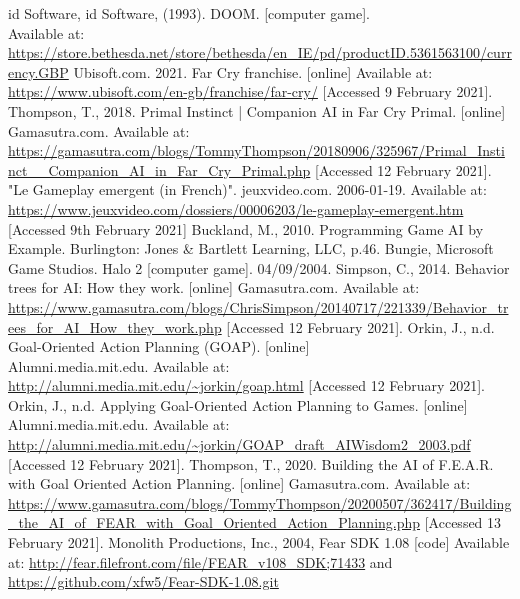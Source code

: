 \documentclass[11pt]{report}
\begin{document}
\begin{thebibliography}{}
    id Software, id Software, (1993). DOOM. [computer game]. \\Available at: \url{https://store.bethesda.net/store/bethesda/en_IE/pd/productID.5361563100/currency.GBP}
    Ubisoft.com. 2021. Far Cry franchise. [online] Available at: \url{https://www.ubisoft.com/en-gb/franchise/far-cry/} [Accessed 9 February 2021].
    Thompson, T., 2018. Primal Instinct | Companion AI in Far Cry Primal. [online] Gamasutra.com. Available at: \url{https://gamasutra.com/blogs/TommyThompson/20180906/325967/Primal_Instinct__Companion_AI_in_Far_Cry_Primal.php} [Accessed 12 February 2021].
    "Le Gameplay emergent (in French)". jeuxvideo.com. 2006-01-19. Available at: \url{https://www.jeuxvideo.com/dossiers/00006203/le-gameplay-emergent.htm} [Accessed 9th February 2021]
    Buckland, M., 2010. Programming Game AI by Example. Burlington: Jones \& Bartlett Learning, LLC, p.46.
    Bungie, Microsoft Game Studios. Halo 2 [computer game]. 04/09/2004.
    Simpson, C., 2014. Behavior trees for AI: How they work. [online] Gamasutra.com. Available at: \url{https://www.gamasutra.com/blogs/ChrisSimpson/20140717/221339/Behavior_trees_for_AI_How_they_work.php} [Accessed 12 February 2021].
    Orkin, J., n.d. Goal-Oriented Action Planning (GOAP). [online] \\Alumni.media.mit.edu. Available at: \url{http://alumni.media.mit.edu/~jorkin/goap.html} [Accessed 12 February 2021].
    Orkin, J., n.d. Applying Goal-Oriented Action Planning to Games. [online] \\Alumni.media.mit.edu. Available at: \url{http://alumni.media.mit.edu/~jorkin/GOAP_draft_AIWisdom2_2003.pdf} [Accessed 12 February 2021].
    Thompson, T., 2020. Building the AI of F.E.A.R. with Goal Oriented Action Planning. [online] Gamasutra.com. Available at: \url{https://www.gamasutra.com/blogs/TommyThompson/20200507/362417/Building_the_AI_of_FEAR_with_Goal_Oriented_Action_Planning.php} [Accessed 13 February 2021].
    Monolith Productions, Inc., 2004, Fear SDK 1.08 [code] Available at: \url{http://fear.filefront.com/file/FEAR_v108_SDK;71433} and \url{https://github.com/xfw5/Fear-SDK-1.08.git}

\end{thebibliography}
\end{document}
